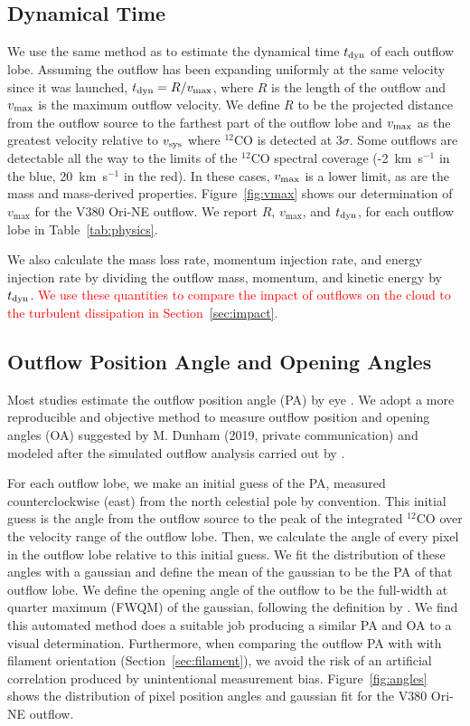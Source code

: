 \documentclass[twocolumn]{aastex62}
\newcommand{\example}{V380 Ori-NE}
\newcommand{\kms}{km~s$^{-1}$}
\newcommand{\co}[1][]{\ensuremath{^{#1}}CO}
\begin{document}
\subsection{Dynamical Time}
We use the same method as \citet{Curtis10} to estimate the dynamical time $t_{\rm dyn}$ of each outflow lobe. Assuming the outflow has been expanding uniformly at the same velocity since it was launched, $t_{\rm dyn} = R / v_{\rm max}$, where $R$ is the length of the outflow and $v_{\rm max}$ is the maximum outflow velocity. We define $R$ to be the projected distance from the outflow source to the farthest part of the outflow lobe and $v_{\rm max}$ as the greatest velocity relative to $v_{\rm sys}$ where \co[12]{} is detected at $3\sigma$. Some outflows are detectable all the way to the limits of the \co[12]{} spectral coverage (-2~\kms{} in the blue, 20~\kms{} in the red). In these cases, $v_{\rm max}$ is a lower limit, as are the mass and mass-derived properties. Figure~\ref{fig:vmax} shows our determination of $v_{\max}$ for the \example{} outflow. We report $R$, $v_{\max}$, and $t_{\rm dyn}$, for each outflow lobe in Table~\ref{tab:physics}.

We also calculate the mass loss rate, momentum injection rate, and energy injection rate by dividing the outflow mass, momentum, and kinetic energy by $t_{\rm dyn}$. \textcolor{red}{We use these quantities to compare the impact of outflows on the cloud to the turbulent dissipation in Section~\ref{sec:impact}.}

\subsection{Outflow Position Angle and Opening Angles}
Most studies estimate the outflow position angle (PA) by eye \citep[e.g.][]{Morgan91,Takahashi08,Plunkett13,Stephens17,Kong19,Tanabe:submitted}. We adopt a more reproducible and objective method to measure outflow position and opening angles (OA)  suggested by M. Dunham (2019, private communication) and modeled after the simulated outflow analysis carried out by \citet{Offner11}.

For each outflow lobe, we make an initial guess of the PA, measured counterclockwise (east) from the north celestial pole by convention. This initial guess is the angle from the outflow source to the peak of the integrated \co[12]{} over the velocity range of the outflow lobe. Then, we calculate the angle of every pixel in the outflow lobe relative to this initial guess. We fit the distribution of these angles with a gaussian and define the mean of the gaussian to be the PA of that outflow lobe. We define the opening angle of the outflow to be the full-width at quarter maximum (FWQM) of the gaussian, following the definition by \cite{Offner11}. We find this automated method does a suitable job producing a similar PA and OA to a visual determination. Furthermore, when comparing the outflow PA with with filament orientation (Section~\ref{sec:filament}), we avoid the risk of an artificial correlation produced by unintentional measurement bias. Figure~\ref{fig:angles} shows the distribution of pixel position angles and gaussian fit for the \example{} outflow.
\end{document}
